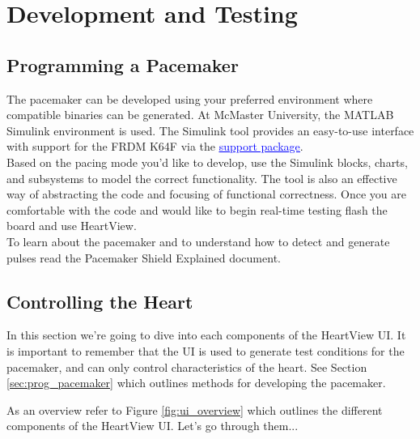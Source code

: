 \documentclass[11pt,fleqn]{book} %
\begin{document}



\section{Development and Testing}

\subsection{Programming a Pacemaker}\label{sec:prog_pacemaker}

The pacemaker can be developed using your preferred environment where compatible binaries can be generated. At McMaster University, the MATLAB Simulink environment is used. The Simulink tool provides an easy-to-use interface with support for the FRDM K64F via the \href{https://www.mathworks.com/matlabcentral/fileexchange/55318-simulink-coder-support-package-for-nxp-frdm-k64f-board}{\textcolor{blue}{\underline{support package}}}.\\ 

Based on the pacing mode you'd like to develop, use the Simulink blocks, charts, and subsystems to model the correct functionality. The tool is also an effective way of abstracting the code and focusing of functional correctness. Once you are comfortable with the code and would like to begin real-time testing flash the board and use HeartView.\\

To learn about the pacemaker and to understand how to detect and generate pulses read the Pacemaker Shield Explained document. 


\subsection{Controlling the Heart}

In this section we're going to dive into each components of the HeartView UI. It is important to remember that the UI is used to generate test conditions for the pacemaker, and can only control characteristics of the heart. See Section \ref{sec:prog_pacemaker} which outlines methods for developing the pacemaker.

As an overview refer to Figure \ref{fig:ui_overview} which outlines the different components of the HeartView UI. Let's go through them...
\end{document}
